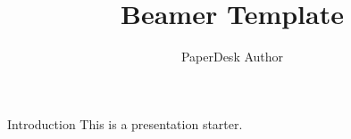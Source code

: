 \documentclass{beamer}
\title{Beamer Template}
\author{PaperDesk Author}
\begin{document}
\frame{\titlepage}
\begin{frame}{Introduction}
This is a presentation starter.
\end{frame}
\end{document}
